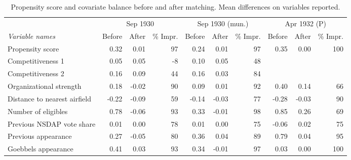 \begin{table}[t!]
\centering
\caption{Propensity score and covariate balance before and after matching. Mean differences on variables reported.\label{tab:balance1}} 
\begingroup\scriptsize
\begin{tabular}{lrrrrrrrrr}
  \toprule
   & \multicolumn{3}{c}{Sep 1930} &  \multicolumn{3}{c}{Sep 1930 (mun.)} & \multicolumn{3}{c}{Apr 1932 (P)}\\\cmidrule(r){2-4} \cmidrule(r){5-7} \cmidrule(r){8-10}\textit{Variable names} & Before & After & \% Impr. & Before & After & \% Impr. & Before & After & \% Impr.\\ \midrule
Propensity score & 0.32 & 0.01 & 97 & 0.24 & 0.01 & 97 & 0.35 & 0.00 & 100 \\ 
  Competitiveness 1 & 0.05 & 0.05 & -8 & 0.10 & 0.05 & 48 &  &  &  \\ 
  Competitiveness 2 & 0.16 & 0.09 & 44 & 0.16 & 0.03 & 84 &  &  &  \\ 
  Organizational strength & 0.18 & -0.02 & 90 & 0.09 & 0.01 & 92 & 0.40 & 0.14 & 66 \\ 
  Distance to nearest airfield & -0.22 & -0.09 & 59 & -0.14 & -0.03 & 77 & -0.28 & -0.03 & 90 \\ 
  Number of eligibles & 0.78 & -0.06 & 93 & 0.33 & -0.01 & 98 & 0.85 & 0.26 & 69 \\ 
  Previous NSDAP vote share & 0.01 & 0.00 & 78 & 0.01 & 0.00 & 75 & -0.06 & 0.02 & 75 \\ 
  Previous appearance & 0.27 & -0.05 & 80 & 0.36 & 0.04 & 89 & 0.79 & 0.04 & 95 \\ 
  Goebbels appearance & 0.41 & 0.03 & 93 & 0.34 & -0.01 & 97 & 0.03 & 0.00 & 100 \\ 
   \bottomrule
\end{tabular}
\endgroup
\end{table}
